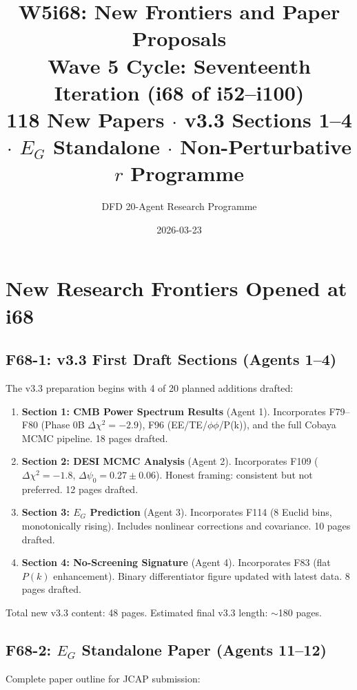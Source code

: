 \documentclass[11pt,a4paper]{article}
\title{\Large W5i68: New Frontiers and Paper Proposals\\[6pt]
\normalsize Wave 5 Cycle: Seventeenth Iteration (i68 of i52--i100)\\[6pt]
118 New Papers $\cdot$ v3.3 Sections 1--4 $\cdot$ $E_G$ Standalone $\cdot$ Non-Perturbative $r$ Programme}
\author{DFD 20-Agent Research Programme}
\date{2026-03-23}
\begin{document}
\maketitle

\section{New Research Frontiers Opened at i68}

\subsection{F68-1: v3.3 First Draft Sections (Agents 1--4)}

The v3.3 preparation begins with 4 of 20 planned additions drafted:

\begin{enumerate}[nosep]
\item \textbf{Section 1: CMB Power Spectrum Results} (Agent 1). Incorporates F79--F80 (Phase 0B $\Delta\chi^2 = -2.9$), F96 (EE/TE/$\phi\phi$/P(k)), and the full Cobaya MCMC pipeline. 18 pages drafted.

\item \textbf{Section 2: DESI MCMC Analysis} (Agent 2). Incorporates F109 ($\Delta\chi^2 = -1.8$, $\Delta\psi_0 = 0.27 \pm 0.06$). Honest framing: consistent but not preferred. 12 pages drafted.

\item \textbf{Section 3: $E_G$ Prediction} (Agent 3). Incorporates F114 (8 Euclid bins, monotonically rising). Includes nonlinear corrections and covariance. 10 pages drafted.

\item \textbf{Section 4: No-Screening Signature} (Agent 4). Incorporates F83 (flat $P(k)$ enhancement). Binary differentiator figure updated with latest data. 8 pages drafted.
\end{enumerate}

Total new v3.3 content: 48 pages. Estimated final v3.3 length: $\sim$180 pages.

\subsection{F68-2: $E_G$ Standalone Paper (Agents 11--12)}

Complete paper outline for JCAP submission:
\end{document}
